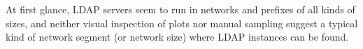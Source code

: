 




At first glance, \gls{LDAP} servers seem to run in networks and prefixes of all kinds of sizes, and neither visual inspection of plots nor manual sampling suggest a typical kind of network segment (or network size) where \gls{LDAP} instances can be found.

